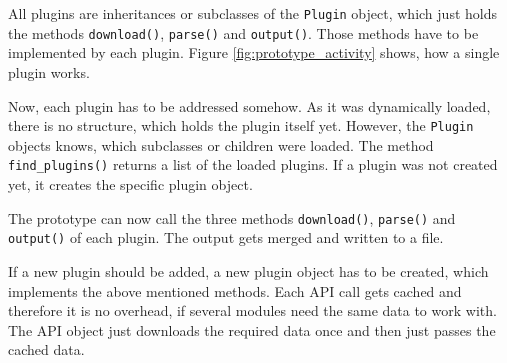 All plugins are inheritances or subclasses of the \texttt{Plugin} object, which
just holds the methods \texttt{download()}, \texttt{parse()} and
\texttt{output()}. Those methods have to be implemented by each plugin. Figure
\ref{fig:prototype_activity} shows, how a single plugin works.

Now, each plugin has to be addressed somehow. As it was dynamically loaded,
there is no structure, which holds the plugin itself yet. However, the
\texttt{Plugin} objects knows, which subclasses or children were loaded. The
method \texttt{find\_plugins()} returns a list of the loaded plugins. If a
plugin was not created yet, it creates the specific plugin object.

The prototype can now call the three methods \texttt{download()},
\texttt{parse()} and \texttt{output()} of each plugin. The output gets merged
and written to a file.

If a new plugin should be added, a new plugin object has to be created, which
implements the above mentioned methods. Each API call gets cached and therefore
it is no overhead, if several modules need the same data to work with. The API
object just downloads the required data once and then just passes the cached
data.

